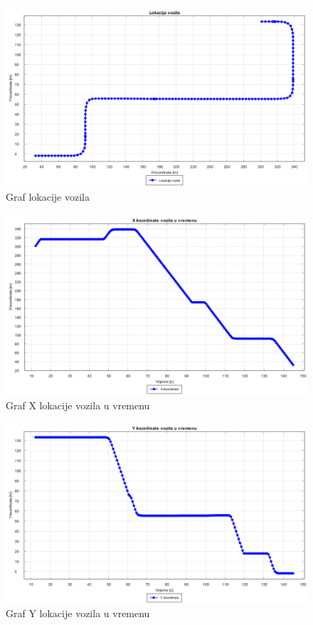 \begin{figure}[h!]
  \includegraphics[scale=0.4]{images/gt_lokacija.png}
  \caption{Graf lokacije vozila}
  \label{fig:gt_lokacija}
\end{figure}
\pagebreak
\begin{figure}[h!]
  \includegraphics[scale=0.4]{images/gt_lokacija_x.png}
  \caption{Graf X lokacije vozila u vremenu}
  \label{fig:gt_lokacija_x}
\end{figure}
\begin{figure}[h!]
  \includegraphics[scale=0.4]{images/gt_lokacija_y.png}
  \caption{Graf Y lokacije vozila u vremenu}
  \label{fig:gt_lokacija_y}
\end{figure}
